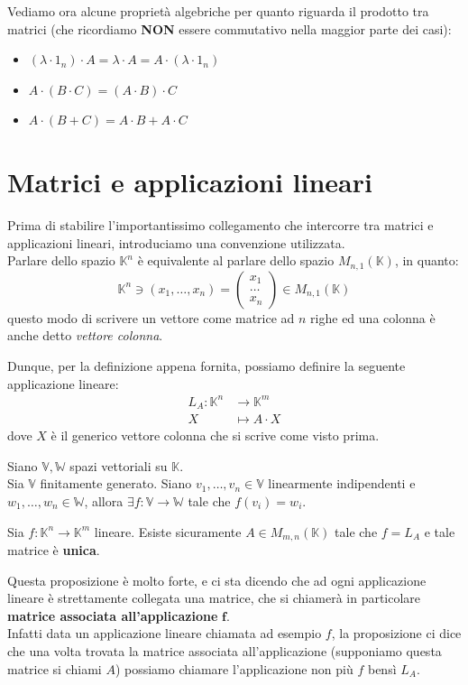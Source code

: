 \documentclass[12pt]{report}
\newcommand{\K}{\mathbb{K}}
\newcommand{\V}{\mathbb{V}}
\newcommand{\W}{\mathbb{W}}
\newcommand{\genericvector}[1]{(#1_1, \dots, #1_n)}
\newcommand{\vectors}[1]{#1_1, \dots, #1_n}
\begin{document}
	Vediamo ora alcune proprietà algebriche per quanto riguarda il prodotto tra matrici (che ricordiamo \textbf{NON} essere commutativo nella maggior parte dei casi):
	\begin{itemize}
		\item $(\lambda \cdot 1_n) \cdot A = \lambda \cdot A = A \cdot (\lambda \cdot 1_n)$
		\item $A \cdot (B \cdot C) = (A \cdot B) \cdot C$
		\item $A \cdot (B + C) = A \cdot B + A \cdot C$
	\end{itemize}
	
	\newpage
	\section{Matrici e applicazioni lineari}
	Prima di stabilire l'importantissimo collegamento che intercorre tra matrici e applicazioni lineari, introduciamo una convenzione utilizzata.\\
	Parlare dello spazio $\K^n$ è equivalente al parlare dello spazio $M_{n,1}(\K)$, in quanto:
	\[
		\K^n \ni \genericvector{x} = 
		\begin{pmatrix}
			x_1\\
			\dots\\
			x_n
		\end{pmatrix}
		\in M_{n, 1}(\K)
	\]
	questo modo di scrivere un vettore come matrice ad $n$ righe ed una colonna è anche detto \textit{vettore colonna}.
	
	Dunque, per la definizione appena fornita, possiamo definire la seguente applicazione lineare:
	\[
		\begin{aligned}
			L_A : \K^n &\to \K^m\\
			X &\mapsto A \cdot X
		\end{aligned}
	\]
	dove $X$ è il generico vettore colonna che si scrive come visto prima.
	
	\begin{proposizione}{}{}
		Siano $\V, \W$ spazi vettoriali su $\K$.\\
		Sia $\V$ finitamente generato.
		Siano $\vectors{v} \in \V$ linearmente indipendenti e $\vectors{w} \in \W$, allora $\exists f: \V \to \W$ tale che $f(v_i) = w_i$.
	\end{proposizione}
	
	\begin{proposizione}{}{}
		Sia $f: \K^n \to \K^m$ lineare.
		Esiste sicuramente $A \in M_{m,n}(\K)$ tale che $f = L_A$ e tale matrice è \textbf{unica}.
	\end{proposizione}
	Questa proposizione è molto forte, e ci sta dicendo che ad ogni applicazione lineare è strettamente collegata una matrice, che si chiamerà in particolare \textbf{matrice associata all'applicazione} $\mathbf{f}$.\\
	Infatti data un applicazione lineare chiamata ad esempio $f$, la proposizione ci dice che una volta trovata la matrice associata all'applicazione (supponiamo questa matrice si chiami $A$) possiamo chiamare l'applicazione non più $f$ bensì $L_A$.
	
\end{document}
